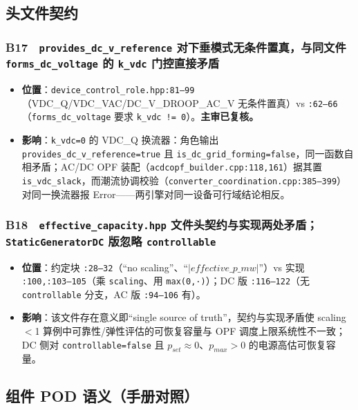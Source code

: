 \documentclass[11pt,a4paper,fontset=fandol]{ctexart}
\newcommand{\file}[1]{\texttt{#1}}
\begin{document}
\subsection{头文件契约}

\subsubsection*{B17　\texttt{provides\_dc\_v\_reference} 对下垂模式无条件置真，与同文件 \texttt{forms\_dc\_voltage} 的 \texttt{k\_vdc} 门控直接矛盾}
\begin{itemize}
  \item \textbf{位置}：\file{device\_control\_role.hpp:81--99}（VDC\_Q/VDC\_VAC/DC\_V\_DROOP\_AC\_V 无条件置真）vs \file{:62--66}（\texttt{forms\_dc\_voltage} 要求 \texttt{k\_vdc != 0}）。\textbf{主审已复核。}
  \item \textbf{影响}：\texttt{k\_vdc=0} 的 VDC\_Q 换流器：角色输出 \texttt{provides\_dc\_v\_reference=true} 且 \texttt{is\_dc\_grid\_forming=false}，同一函数自相矛盾；AC/DC OPF 装配（\file{acdcopf\_builder.cpp:118,161}）据其置 \texttt{is\_vdc\_slack}，而潮流协调校验（\file{converter\_coordination.cpp:385--399}）对同一换流器报 Error——两引擎对同一设备可行域结论相反。
\end{itemize}

\subsubsection*{B18　\texttt{effective\_capacity.hpp} 文件头契约与实现两处矛盾；\texttt{StaticGeneratorDC} 版忽略 \texttt{controllable}}
\begin{itemize}
  \item \textbf{位置}：约定块 \file{:28--32}（``no scaling''、``$|effective\_p\_mw|$''）vs 实现 \file{:100,:103--105}（乘 \texttt{scaling}、用 \texttt{max(0,·)}）；DC 版 \file{:116--122}（无 \texttt{controllable} 分支，AC 版 \file{:94--106} 有）。
  \item \textbf{影响}：该文件存在意义即``single source of truth''，契约与实现矛盾使 scaling$<$1 算例中可靠性/弹性评估的可恢复容量与 OPF 调度上限系统性不一致；DC 侧对 \texttt{controllable=false} 且 $p_{set}\approx0$、$p_{max}>0$ 的电源高估可恢复容量。
\end{itemize}

\subsection{组件 POD 语义（手册对照）}
\end{document}
